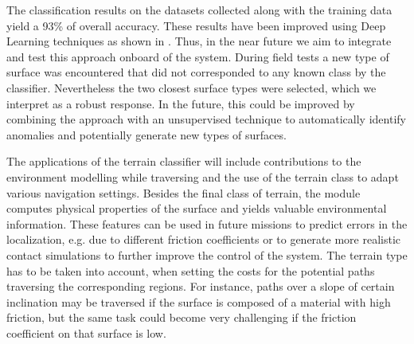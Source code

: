 \documentclass{article}
\begin{document}
The classification results on the datasets collected along with the training data yield a 93\% of overall accuracy. 
These results have been improved using Deep Learning techniques as shown in \cite{ugenti2021}. 
Thus, in the near future we aim to integrate and test this approach onboard of the system.
During field tests a new type of surface was encountered that did not corresponded to any known class by the classifier. 
Nevertheless the two closest surface types were selected, which we interpret as a robust response.
In the future, this could be improved by combining the approach with an unsupervised technique to automatically identify anomalies and potentially generate new types of surfaces.

The applications of the terrain classifier will include contributions to the environment modelling while traversing and the use of the terrain class to adapt various navigation settings.
Besides the final class of terrain, the module computes physical properties of the surface and yields valuable environmental information. 
These features can be used in future missions to predict errors in the localization, e.g. due to different friction coefficients or to generate more realistic contact simulations to further improve the control of the system.
The terrain type has to be taken into account, when setting the costs for the potential paths traversing the corresponding regions. 
For instance, paths over a slope of certain inclination may be traversed if the surface is composed of a material with high friction, but the same task could become very challenging if the friction coefficient on that surface is low. \\


\clearpage



\end{document}
